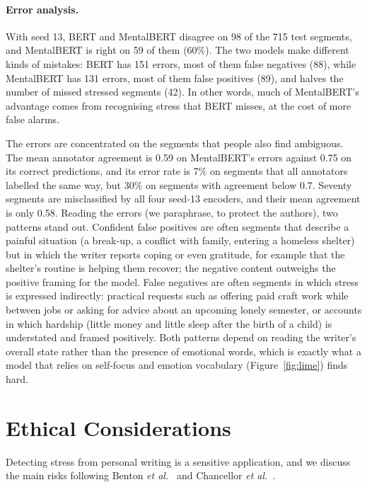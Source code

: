 \paragraph{Error analysis.}
With seed 13, BERT and MentalBERT disagree on 98 of the 715 test segments, and MentalBERT is right on
59 of them (60\%). The two models make different kinds of mistakes: BERT has 151 errors, most of them
false negatives (88), while MentalBERT has 131 errors, most of them false positives (89), and halves
the number of missed stressed segments (42). In other words, much of MentalBERT's advantage comes
from recognising stress that BERT misses, at the cost of more false alarms.

The errors are concentrated on the segments that people also find ambiguous. The mean annotator
agreement is 0.59 on MentalBERT's errors against 0.75 on its correct predictions, and its error rate
is 7\% on segments that all annotators labelled the same way, but 30\% on segments with agreement
below 0.7. Seventy segments are misclassified by all four seed-13 encoders, and their mean agreement
is only 0.58. Reading the errors (we paraphrase, to protect the authors), two patterns stand out.
Confident false positives are often segments that describe a painful situation (a break-up, a
conflict with family, entering a homeless shelter) but in which the writer reports coping or even
gratitude, for example that the shelter's routine is helping them recover; the negative content
outweighs the positive framing for the model. False negatives are often segments in which stress is
expressed indirectly: practical requests such as offering paid craft work while between jobs or
asking for advice about an upcoming lonely semester, or accounts in which hardship (little money and
little sleep after the birth of a child) is understated and framed positively. Both patterns depend
on reading the writer's overall state rather than the presence of emotional words, which is exactly
what a model that relies on self-focus and emotion vocabulary (Figure~\ref{fig:lime}) finds hard.

\section{Ethical Considerations}
\label{sec:ethics}
Detecting stress from personal writing is a sensitive application, and we discuss the main risks
following Benton {\it et al.}~ and Chancellor {\it et al.}~.


